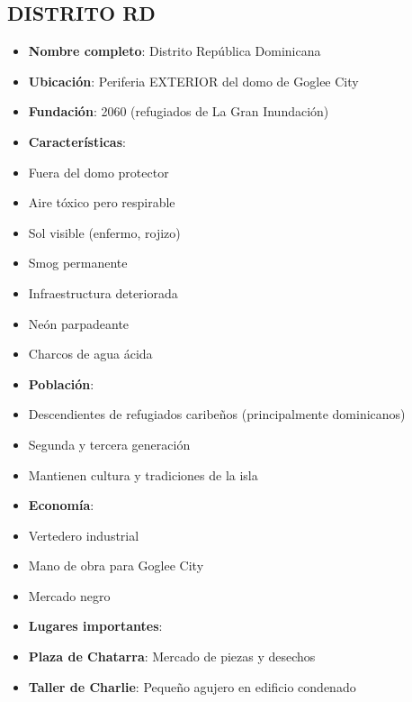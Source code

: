\documentclass[11pt,a4paper]{report}
\begin{document}
\subsection{DISTRITO RD}
\begin{itemize}
  \item \textbf{Nombre completo}: Distrito República Dominicana
  \item \textbf{Ubicación}: Periferia EXTERIOR del domo de Goglee City
  \item \textbf{Fundación}: 2060 (refugiados de La Gran Inundación)
  \item \textbf{Características}:
  \item Fuera del domo protector
  \item Aire tóxico pero respirable
  \item Sol visible (enfermo, rojizo)
  \item Smog permanente
  \item Infraestructura deteriorada
  \item Neón parpadeante
  \item Charcos de agua ácida
  \item \textbf{Población}: 
  \item Descendientes de refugiados caribeños (principalmente dominicanos)
  \item Segunda y tercera generación
  \item Mantienen cultura y tradiciones de la isla
  \item \textbf{Economía}: 
  \item Vertedero industrial
  \item Mano de obra para Goglee City
  \item Mercado negro
  \item \textbf{Lugares importantes}:
  \item \textbf{Plaza de Chatarra}: Mercado de piezas y desechos
  \item \textbf{Taller de Charlie}: Pequeño agujero en edificio condenado

\end{itemize}
\end{document}
